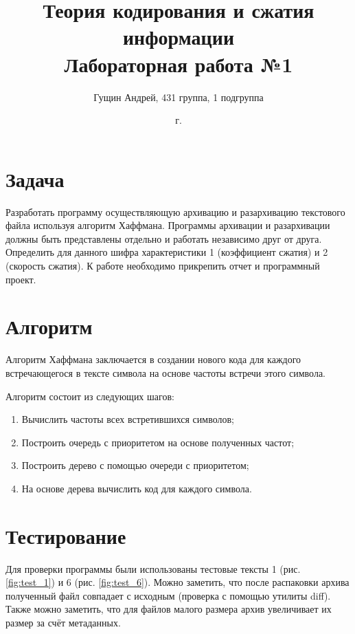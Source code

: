 \documentclass[a4paper,oneside]{article}
\title{{Теория кодирования и сжатия информации}\\{Лабораторная работа №1}}
\author{Гущин Андрей, 431 группа, 1 подгруппа}
\date{\the\year{} г.}
\theoremstyle{definition}
\begin{document}
\maketitle

\section{Задача}

Разработать программу осуществляющую архивацию и разархивацию текстового файла
используя алгоритм Хаффмана. Программы архивации и разархивации должны быть
представлены отдельно и работать независимо друг от друга. Определить для
данного шифра характеристики 1 (коэффициент сжатия) и 2 (скорость сжатия). К
работе необходимо прикрепить отчет и программный проект.


\section{Алгоритм}

Алгоритм Хаффмана заключается в создании нового кода для каждого встречающегося
в тексте символа на основе частоты встречи этого символа.

Алгоритм состоит из следующих шагов:
\begin{enumerate}
    \item Вычислить частоты всех встретившихся символов;
    \item Построить очередь с приоритетом на основе полученных частот;
    \item Построить дерево с помощью очереди с приоритетом;
    \item На основе дерева вычислить код для каждого символа.
\end{enumerate}


\section{Тестирование}

Для проверки программы были использованы тестовые тексты 1 (рис.
\ref{fig:test_1}) и 6 (рис. \ref{fig:test_6}). Можно заметить,
что после распаковки архива полученный файл совпадает с исходным (проверка
с помощью утилиты diff). Также можно заметить, что для файлов малого размера
архив увеличивает их размер за счёт метаданных.
\end{document}
